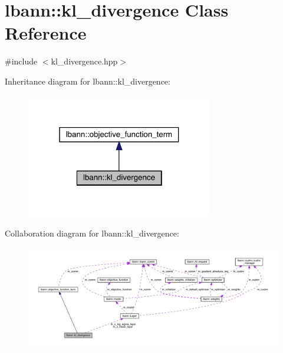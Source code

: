 \hypertarget{classlbann_1_1kl__divergence}{}\section{lbann\+:\+:kl\+\_\+divergence Class Reference}
\label{classlbann_1_1kl__divergence}


{\ttfamily \#include $<$kl\+\_\+divergence.\+hpp$>$}



Inheritance diagram for lbann\+:\+:kl\+\_\+divergence\+:\nopagebreak
\begin{figure}[H]
\begin{center}
\leavevmode
\includegraphics[width=232pt]{classlbann_1_1kl__divergence__inherit__graph}
\end{center}
\end{figure}


Collaboration diagram for lbann\+:\+:kl\+\_\+divergence\+:\nopagebreak
\begin{figure}[H]
\begin{center}
\leavevmode
\includegraphics[width=350pt]{classlbann_1_1kl__divergence__coll__graph}
\end{center}
\end{figure}
